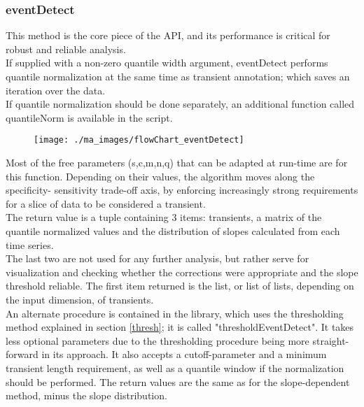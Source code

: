 \documentclass[titlepage]{article}
\begin{document}
\subsubsection{eventDetect}
This method is the core piece of the API, and its performance is critical for robust and reliable analysis.\\
If supplied with a non-zero quantile width argument, eventDetect performs quantile normalization at the same time as transient annotation; which saves an iteration over the data.\\
If quantile normalization should be done separately, an additional function called quantileNorm is available in the script.
\begin{figure}[h]
\centering
\texttt{[image: ./ma\_images/flowChart\_eventDetect]}
\label{fig:flowChart_eventDetect}
\end{figure}
Most of the free parameters (s,c,m,n,q) that can be adapted at run-time are for this function. Depending on their values, the algorithm moves along the specificity- sensitivity trade-off axis, by enforcing increasingly strong requirements for a slice of data to be considered a transient.\\
The return value is a tuple containing 3 items: transients, a matrix of the quantile normalized values and the distribution of slopes calculated from each time series.\\
The last two are not used for any further analysis, but rather serve for visualization and checking whether the corrections were appropriate and the slope threshold reliable. The first item returned is the list, or list of lists, depending on the input dimension, of transients.\\
An alternate procedure is contained in the library, which uses the thresholding method explained in section \ref{thresh}; it is called "thresholdEventDetect". It takes less optional parameters due to the thresholding procedure being more straight-forward in its approach. It also accepts a cutoff-parameter and a minimum transient length requirement, as well as a quantile window if the normalization should be performed. The return values are the same as for the slope-dependent method, minus the slope distribution.
\end{document}
